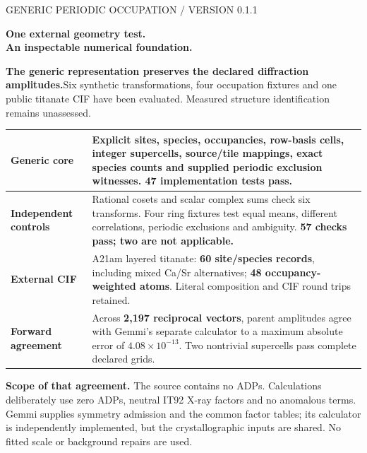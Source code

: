 \documentclass[10pt,a4paper]{article}
\newcommand{\callout}[1]{\colorbox{pale}{\parbox{\dimexpr\linewidth-2\fboxsep\relax}{#1}}}
\begin{document}
{\sffamily\small\color{teal} GENERIC PERIODIC OCCUPATION / VERSION 0.1.1}\par
{\LARGE\bfseries\color{ink} One external geometry test.\\An inspectable numerical foundation.}\par
\callout{\textbf{The generic representation preserves the declared diffraction amplitudes.}\newline Six synthetic transformations, four occupation fixtures and one public titanate CIF have been evaluated. Measured structure identification remains unassessed.}

\begin{tabularx}{\linewidth}{@{}>{\raggedright\arraybackslash\bfseries\color{ink}}p{30mm} X@{}}
\toprule
Generic core & Explicit sites, species, occupancies, row-basis cells, integer supercells, source/tile mappings, exact species counts and supplied periodic exclusion witnesses. \textbf{47 implementation tests pass.}\\
\midrule
Independent controls & Rational cosets and scalar complex sums check six transforms. Four ring fixtures test equal means, different correlations, periodic exclusions and ambiguity. \textbf{57 checks pass; two are not applicable.}\\
\midrule
External CIF & A21am layered titanate: \textbf{60 site/species records}, including mixed Ca/Sr alternatives; \textbf{48 occupancy-weighted atoms}. Literal composition and CIF round trips retained.\\
\midrule
Forward agreement & Across \textbf{2,197 reciprocal vectors}, parent amplitudes agree with Gemmi's separate calculator to a maximum absolute error of \textbf{$4.08\times10^{-13}$}. Two nontrivial supercells pass complete declared grids.\\
\bottomrule
\end{tabularx}

\textbf{Scope of that agreement.} The source contains no ADPs. Calculations deliberately use zero ADPs, neutral IT92 X-ray factors and no anomalous terms. Gemmi supplies symmetry admission and the common factor tables; its calculator is independently implemented, but the crystallographic inputs are shared. No fitted scale or background repairs are used.
\end{document}
